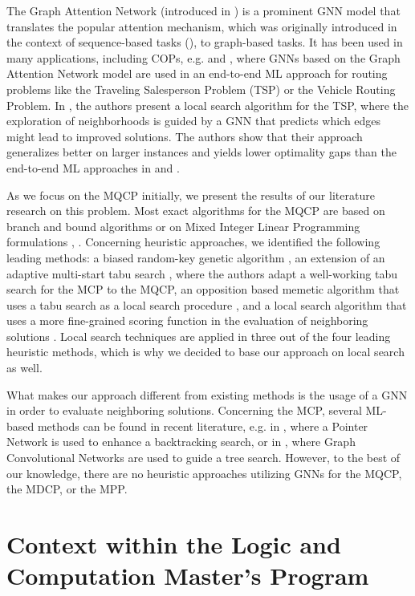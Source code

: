\documentclass[11pt]{article}
\begin{document}
 The Graph Attention Network (introduced in \cite{Velickovic2018}) is a prominent GNN model that translates the popular attention mechanism, which was originally introduced in the context of sequence-based tasks (\cite{Bahdanau2015}), to graph-based tasks. It has been used in many applications, including COPs, e.g. \cite{Kool2019} and \cite{Joshi2021}, where GNNs based on the Graph Attention Network model are used in an end-to-end ML approach for routing problems like the Traveling Salesperson Problem (TSP) or the Vehicle Routing Problem. In \cite{Hudson2021}, the authors present a local search algorithm for the TSP, where the exploration of neighborhoods is guided by a GNN that predicts which edges might lead to improved solutions. The authors show that their approach generalizes better on larger instances and yields lower optimality gaps than the end-to-end ML approaches in \cite{Kool2019} and \cite{Joshi2021}.  

As we focus on the MQCP initially, we present the results of our literature research on this problem. Most exact algorithms for the MQCP are based on branch and bound algorithms \cite{mahdavi2014branch} or on Mixed Integer Linear Programming formulations \cite{ribeiro_exact_2019}, \cite{Marinelli2021}. Concerning heuristic approaches, we identified the following leading methods: a biased random-key genetic algorithm \cite{pinto_biased_2018}, an extension of an adaptive multi-start tabu search \cite{djeddi_extension_2019}, where the authors adapt a well-working tabu search for the MCP to the MQCP, an opposition based memetic algorithm that uses a tabu search as a local search procedure \cite{zhou_opposition-based_2020}, and a local search algorithm that uses a more fine-grained scoring function in the evaluation of neighboring solutions \cite{chen_nuqclq_2021}. Local search techniques are applied in three out of the four leading heuristic methods, which is why we decided to base our approach on local search as well.  

What makes our approach different from existing methods is the usage of a GNN in order to evaluate neighboring solutions. Concerning the MCP, several ML-based methods can be found in recent literature, e.g. in \cite{Gu2020}, where a Pointer Network is used to enhance a backtracking search, or in \cite{Li2018}, where Graph Convolutional Networks are used to guide a tree search. However, to the best of our knowledge, there are no heuristic approaches utilizing GNNs for the MQCP, the MDCP, or the MPP. 

\section{Context within the Logic and Computation Master's Program}
\end{document}
